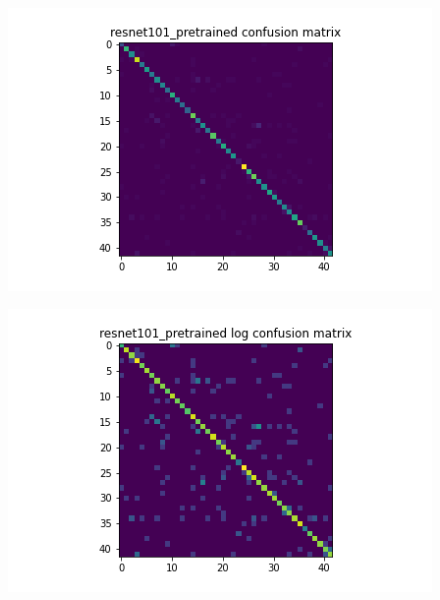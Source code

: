\begin{figure}[t]
  \begin{minipage}[b]{.5\linewidth}
    \centering
    {\includegraphics[width=1.2\textwidth]{figs/conf_matrix/resnet101_pretrained_conf.png}}
  \end{minipage}
  \hfill
  \begin{minipage}[b]{.5\linewidth}
    \centering

    {\includegraphics[width=1.2\textwidth]{figs/conf_matrix/resnet101_pretrained_log_conf.png}}
  \end{minipage}
  \vfill
  \begin{minipage}[b]{.5\linewidth}
    \centering


\end{minipage}
\end{figure}
